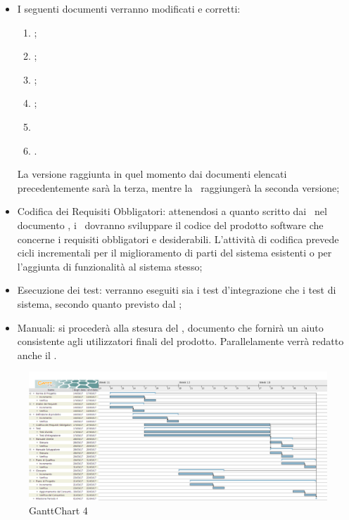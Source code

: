 \documentclass[../PianoDiProgetto_v3.0.0.tex]{subfiles}
\begin{document}
	\begin{itemize}
		\item I seguenti documenti verranno modificati e corretti:
			\begin{enumerate}
				\item \normediprogetto;
				\item \analisideirequisiti;
				\item \pianodiqualifica;
				\item \pianodiprogetto;
				\item {}
				\item \glossario.
			\end{enumerate}
		La versione raggiunta in quel momento dai documenti elencati precedentemente sarà la terza, mentre la \ raggiungerà la seconda versione;
		\item Codifica dei Requisiti Obbligatori: attenendosi a quanto scritto dai \progettisti\ nel documento , i \programmatori\ dovranno sviluppare il codice del prodotto software che concerne i requisiti obbligatori e desiderabili. L'attività di codifica prevede cicli incrementali per il miglioramento di parti del sistema esistenti o per l'aggiunta di funzionalità al sistema stesso;
		\item Esecuzione dei test: verranno eseguiti sia i test d'integrazione che i test di sistema, secondo quanto previsto dal \pianodiqualifica;
		\item Manuali: si procederà alla stesura del \manualeutente, documento che fornirà un aiuto consistente agli utilizzatori finali del prodotto. Parallelamente verrà redatto anche il \manualesviluppatore.
	\end{itemize}	
		
	\begin{figure}[!h]
		\centering
		\includegraphics[width=\textwidth]{Pianificazione/Immagini/GanttChart04.png}
		\caption{GanttChart 4}
	\end{figure}	
	
\end{document}
